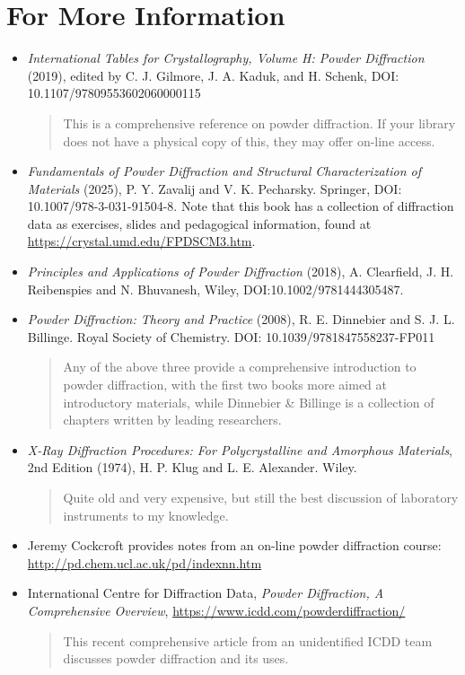 \section{For More Information}

\begin{itemize}
\item 
  \textit{International Tables for Crystallography, Volume H: Powder Diffraction} (2019), edited by C. J. Gilmore, J. A. Kaduk, and H. Schenk, DOI: 10.1107/97809553602060000115
  \begin{quote}
This is a comprehensive reference on powder diffraction. If your library does not have a physical copy of this, they may offer on-line access.
  \end{quote}

\item\textit{Fundamentals of Powder Diffraction and Structural Characterization of Materials} (2025), P. Y. Zavalij and V. K. Pecharsky. Springer, DOI: 10.1007/978-3-031-91504-8. Note that this book has a collection of diffraction data as exercises, slides and pedagogical information, found at \url{https://crystal.umd.edu/FPDSCM3.htm}.

\item\textit{Principles and Applications of Powder Diffraction} (2018), A. Clearfield, J. H. Reibenspies and N. Bhuvanesh, Wiley, DOI:10.1002/9781444305487.  

\item\textit{Powder Diffraction: Theory and Practice} (2008), R. E. Dinnebier and S. J. L. Billinge. Royal Society of Chemistry.
DOI: 10.1039/9781847558237-FP011
\begin{quote}
Any of the above three provide a comprehensive introduction to powder diffraction, with the first two books more aimed at introductory materials, while Dinnebier \& Billinge is a collection of chapters written by leading researchers.
\end{quote}

\item\textit{X-Ray Diffraction Procedures: For Polycrystalline and Amorphous Materials}, 2nd Edition (1974), H. P. Klug and L. E. Alexander. Wiley. 
\begin{quote}
Quite old and very expensive, but still the best discussion of laboratory instruments to my knowledge. 
\end{quote}

\item
Jeremy Cockcroft provides notes from an on-line powder diffraction course:
\url{http://pd.chem.ucl.ac.uk/pd/indexnn.htm}

\item
International Centre for Diffraction Data,
\textit{Powder Diffraction, A Comprehensive Overview},
\url{https://www.icdd.com/powderdiffraction/}
\begin{quote}
This recent comprehensive article from an unidentified ICDD team discusses powder diffraction and its uses. 
\end{quote}

\end{itemize}
